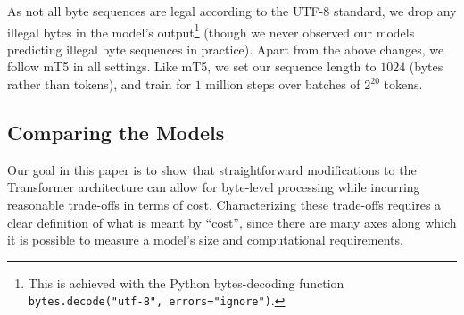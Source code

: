 \documentclass[11pt,a4paper]{article}
\begin{document}
As not all byte sequences are legal according to the \mbox{UTF-8} standard, we drop any illegal bytes in the model's output\footnote{This is achieved with the Python bytes-decoding function \texttt{bytes.decode("utf-8", errors="ignore")}.} (though we never observed our models predicting illegal byte sequences in practice). Apart from the above changes, we follow mT5 in all settings. Like mT5, we set our sequence length to $1024$ (bytes rather than tokens), and train for $1$ million steps over batches of $2^{20}$ tokens.

\subsection{Comparing the Models}

Our goal in this paper is to show that straightforward modifications to the Transformer architecture can allow for byte-level processing while incurring reasonable trade-offs in terms of cost.
Characterizing these trade-offs requires a clear definition of what is meant by ``cost'', since there are many axes along which it is possible to measure a model's size and computational requirements.

\begin{table}[t!]
\hspace{-8pt}
\centering
{}
\caption{Comparison of mT5 and ByT5 architectures. For a given named size (e.g.~``Large''), the total numbers of parameters and layers are fixed. ``Vocab'' shows the percentage of vocabulary-related parameters, counting both the input embedding matrix and the decoder softmax layer. ByT5 moves these parameters out of the vocabulary and into the transformer layers, as well as shifting to a $3$:$1$ ratio of encoder to decoder layers.}
\label{tab:model_params}
\end{table}
\end{document}
